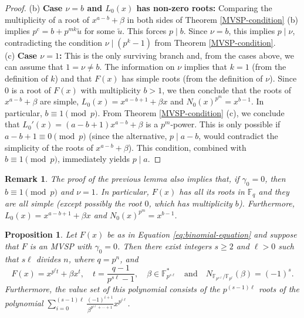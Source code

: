 \documentclass[preprint,12pt]{elsarticle}
\newtheorem{proposition}[theorem]{Proposition}
\newtheorem{remark}[theorem]{Remark}
\begin{document}
\begin{proof}
    \noindent (b) \textbf{Case $\nu = b$ and $L_0(x)$ has non-zero roots:} Comparing the multiplicity of a root of $x^{a-b}+\beta$ in both sides of Theorem \ref{MVSP-condition} (b) implies $p^c = b+p^{mk}\tilde{u}$ for some $\tilde{u}$. This forces $p \mid b$. Since $\nu = b$, this implies $p \mid \nu$, contradicting the condition $\nu \mid (p^k - 1)$ from Theorem \ref{MVSP-condition}. \\
    
    \noindent (c) \textbf{Case $\nu = 1$:} This is the only surviving branch and, from the cases above, we can assume that $1 = \nu \neq b$. The information on $\nu$ implies that $k = 1$ (from the definition of $k$) and that $F(x)$ has simple roots (from the definition of $\nu$). Since $0$ is a root of $F(x)$ with multiplicity $b > 1$, we then conclude that the roots of $x^{a - b} + \beta$ are simple, $L_0(x) = x^{a - b + 1} + \beta x$ and $N_0(x)^{p^m} = x^{b - 1}$. In particular, $b \equiv 1 \pmod{p}$. From Theorem \ref{MVSP-condition} (c), we conclude that $L_0'(x) = (a - b + 1)x^{a - b} + \beta$ is a $p^m$-power. This is only possible if $a - b + 1 \equiv 0 \pmod{p}$ (since the alternative, $p \mid a - b$, would contradict the simplicity of the roots of $x^{a - b} + \beta$). This condition, combined with $b \equiv 1 \pmod{p}$,
    immediately yields $p \mid a$.
\end{proof}

\begin{remark}\label{rmk}
    The proof of the previous lemma also implies that, if $\gamma_0 = 0$, then $b \equiv 1 \pmod{p}$ and $\nu = 1$. In particular, $F(x)$ has all its roots in $\mathbb{F}_q$ and they are all simple (except possibly the root $0$, which has multiplicity $b$). Furthermore, $L_0(x) = x^{a - b + 1} + \beta x$ and $N_0(x)^{p^m} = x^{b - 1}$.
\end{remark}

\begin{proposition}\label{Vf>2}
    Let $F(x)$ be as in Equation \eqref{eq:binomial-equation} and suppose that $F$ is an MVSP with $\gamma_0 = 0$. Then there exist integers $s \geq 2$ and $\ell > 0$ such that $s\ell$ divides $n$, where $q = p^n$, and 
    $$F(x) = x^{p^{\ell}t} + \beta x^t, \quad t = \frac{q - 1}{p^{s\ell} - 1}, \quad \beta \in \mathbb{F}_{p^{s\ell}}^* \quad \textrm{and}\quad N_{\mathbb{F}_{p^{s\ell}} / \mathbb{F}_{p^{\ell}}}(\beta) = (-1)^s.$$
    Furthermore, the value set of this polynomial consists of the $p^{(s-1)\ell}$ roots of the polynomial $\sum_{i = 0}^{(s - 1)\ell}\frac{(-1)^{i + 1}}{\beta^{p^{i\ell} + \cdots + 1}}x^{p^{i\ell}}$.
\end{proposition}
\end{document}
